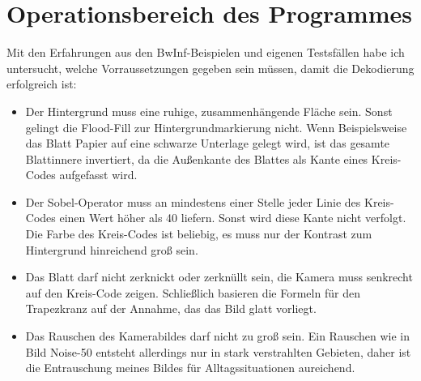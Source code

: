 \pagebreak
\section {Operationsbereich des Programmes}
Mit den Erfahrungen aus den BwInf-Beispielen und eigenen Testsfällen habe ich untersucht, welche Vorraussetzungen gegeben sein müssen, damit die Dekodierung erfolgreich ist:
\begin{itemize}
	\item Der Hintergrund muss eine ruhige, zusammenhängende Fläche sein. Sonst gelingt die Flood-Fill zur Hintergrundmarkierung nicht. Wenn Beispielsweise das Blatt Papier auf eine schwarze Unterlage gelegt wird, ist das gesamte Blattinnere invertiert, da die Außenkante des Blattes als Kante eines Kreis-Codes aufgefasst wird.
	\item Der Sobel-Operator muss an mindestens einer Stelle jeder Linie des Kreis-Codes einen Wert höher als 40 liefern. Sonst wird diese Kante nicht verfolgt. Die Farbe des Kreis-Codes ist beliebig, es muss nur der Kontrast zum Hintergrund hinreichend groß sein.
	\item Das Blatt darf nicht zerknickt oder zerknüllt sein, die Kamera muss senkrecht auf den Kreis-Code zeigen. Schließlich basieren die Formeln für den Trapezkranz auf der Annahme, das das Bild glatt vorliegt. 
	\item Das Rauschen des Kamerabildes darf nicht zu groß sein. Ein Rauschen wie in Bild Noise-50 entsteht allerdings nur in stark verstrahlten Gebieten, daher ist die Entrauschung meines Bildes für Alltagssituationen aureichend.
\end{itemize}